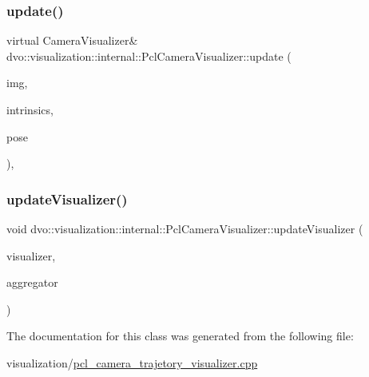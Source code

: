 \subsubsection{\texorpdfstring{update()}{update()}}
{\footnotesize\ttfamily virtual Camera\+Visualizer\& dvo\+::visualization\+::internal\+::\+Pcl\+Camera\+Visualizer\+::update (\begin{DoxyParamCaption}\item[{const dvo\+::core\+::\+Rgbd\+Image \&}]{img,  }\item[{const dvo\+::core\+::\+Intrinsic\+Matrix \&}]{intrinsics,  }\item[{const Eigen\+::\+Affine3d \&}]{pose }\end{DoxyParamCaption})\hspace{0.3cm}{\ttfamily [inline]}, {\ttfamily [virtual]}}

\mbox{\label{classdvo_1_1visualization_1_1internal_1_1_pcl_camera_visualizer_adbc6ea5a07dace4e06773d568986424b}} 
\subsubsection{\texorpdfstring{update\+Visualizer()}{updateVisualizer()}}
{\footnotesize\ttfamily void dvo\+::visualization\+::internal\+::\+Pcl\+Camera\+Visualizer\+::update\+Visualizer (\begin{DoxyParamCaption}\item[{pcl\+::visualization\+::\+P\+C\+L\+Visualizer \&}]{visualizer,  }\item[{Point\+Cloud\+Aggregator \&}]{aggregator }\end{DoxyParamCaption})\hspace{0.3cm}{\ttfamily [inline]}}



The documentation for this class was generated from the following file\+:\begin{DoxyCompactItemize}
\item 
visualization/\mbox{\hyperlink{pcl__camera__trajetory__visualizer_8cpp}{pcl\+\_\+camera\+\_\+trajetory\+\_\+visualizer.\+cpp}}\end{DoxyCompactItemize}
